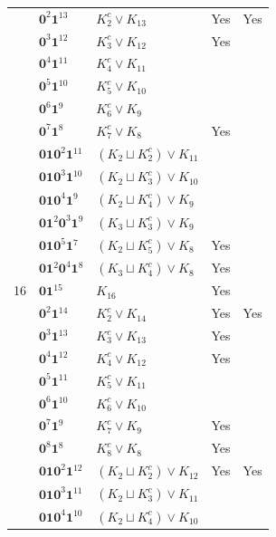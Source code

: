 \documentclass[preprint]{elsarticle}
\begin{document}
\begin{center}
\begin{longtable}{p{0.7cm} p{2cm} p{4cm} p{1cm} p{0cm}}
&$\mathbf{0}^2 \mathbf{1}^{13}$ & $ K_{2}^c \vee K_{13}$ & Yes&Yes\\
&$\mathbf{0}^3 \mathbf{1}^{12}$ & $ K_{3}^c \vee K_{12}$ & Yes&\\
&$\mathbf{0}^4 \mathbf{1}^{11}$ & $ K_{4}^c \vee K_{11}$ & &\\
&$\mathbf{0}^5 \mathbf{1}^{10}$ & $ K_{5}^c \vee K_{10}$ & &\\
&$\mathbf{0}^6 \mathbf{1}^9$ & $ K_{6}^c \vee K_{9}$ & &\\
&$\mathbf{0}^7 \mathbf{1}^8$ & $ K_{7}^c \vee K_{8}$ & Yes&\\
&$\mathbf{0}\mathbf{1}\mathbf{0}^2 \mathbf{1}^{11}$ & $ (K_{2} \sqcup K_{2}^c )\vee K_{11}$ & &\\
&$\mathbf{0}\mathbf{1}\mathbf{0}^3 \mathbf{1}^{10}$ & $ (K_{2} \sqcup K_{3}^c )\vee K_{10}$ & &\\
&$\mathbf{0}\mathbf{1}\mathbf{0}^4 \mathbf{1}^{9}$ & $ (K_{2} \sqcup K_{4}^c )\vee K_{9}$ & &\\
&$\mathbf{0}\mathbf{1}^2 \mathbf{0}^3 \mathbf{1}^{9}$ & $ (K_{3} \sqcup K_{3}^c )\vee K_{9}$ & &\\
&$\mathbf{0}\mathbf{1}\mathbf{0}^5 \mathbf{1}^{7}$ & $ (K_{2} \sqcup K_{5}^c )\vee K_{8}$ & Yes&\\
&$\mathbf{0}\mathbf{1}^2 \mathbf{0}^4 \mathbf{1}^8$ & $ (K_{3} \sqcup K_{4}^c )\vee K_{8}$ & Yes&\\
\hline
16&$\mathbf{0}\mathbf{1}^{15}$ & $ K_{16}$ & Yes&\\
&$\mathbf{0}^2 \mathbf{1}^{14}$ & $ K_{2}^c \vee K_{14}$ & Yes& Yes\\
&$\mathbf{0}^3 \mathbf{1}^{13}$ & $ K_{3}^c \vee K_{13}$ & Yes&\\
&$\mathbf{0}^4 \mathbf{1}^{12}$ & $ K_{4}^c \vee K_{12}$ & Yes&\\
&$\mathbf{0}^5 \mathbf{1}^{11}$ & $ K_{5}^c \vee K_{11}$ & &\\
&$\mathbf{0}^6 \mathbf{1}^{10}$ & $ K_{6}^c \vee K_{10}$ & &\\
&$\mathbf{0}^7 \mathbf{1}^9$ & $ K_{7}^c \vee K_{9}$ & Yes&\\
&$\mathbf{0}^8 \mathbf{1}^8$ & $ K_{8}^c \vee K_{8}$ & Yes&\\
&$\mathbf{0}\mathbf{1}\mathbf{0}^2 \mathbf{1}^{12}$ & $ (K_{2} \sqcup K_{2}^c) \vee K_{12}$ & Yes& Yes\\
&$\mathbf{0}\mathbf{1}\mathbf{0}^3 \mathbf{1}^{11}$ & $ (K_{2} \sqcup K_{3}^c )\vee K_{11}$ & &\\
&$\mathbf{0}\mathbf{1}\mathbf{0}^4 \mathbf{1}^{10}$ & $ (K_{2} \sqcup K_{4}^c )\vee K_{10}$ & &\\

\end{longtable}
\end{center}
\end{document}
